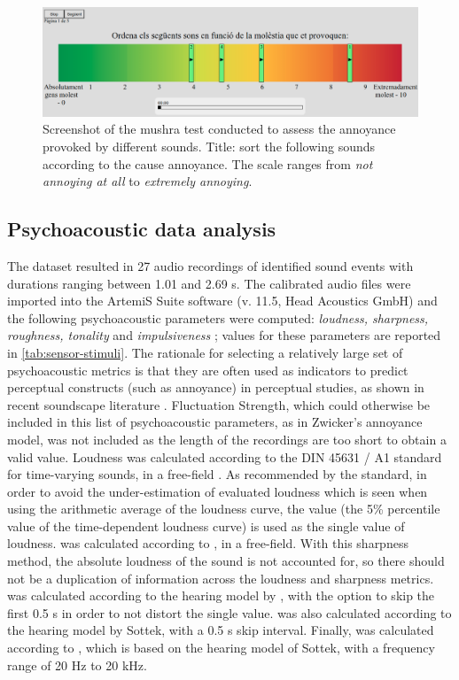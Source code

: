 \begin{figure}
  \centering
  \includegraphics[width=\textwidth]{Figures/mushraScreenShot02.png}
  \caption{Screenshot of the \gls{mushra} test conducted to assess the annoyance provoked by different sounds. Title: sort the following sounds according to the cause annoyance. The scale ranges from \emph{not annoying at all} to \emph{extremely annoying}.  \label{fig:mushra-test}}
\end{figure}

\subsection{Psychoacoustic data analysis}

The dataset resulted in 27 audio recordings of identified sound events with durations ranging between 1.01 and 2.69 s. The calibrated audio files were imported into the ArtemiS Suite software (v. 11.5, Head Acoustics GmbH) and the following psychoacoustic parameters were computed: \emph{loudness, sharpness, roughness, tonality} and \emph{impulsiveness} \citep{PsychoacousticsfactsmodelsZwicker}; values for these parameters are reported in \cref{tab:sensor-stimuli}. The rationale for selecting a relatively large set of psychoacoustic metrics is that they are often used as indicators to predict perceptual constructs (such as annoyance) in perceptual studies, as shown in recent soundscape literature \citep{Aletta2016Soundscape,Aletta2017Dimensions}. Fluctuation Strength, which could otherwise be included in this list of psychoacoustic parameters, as in Zwicker's annoyance model, was not included as the length of the recordings are too short to obtain a valid value. Loudness was calculated according to the DIN 45631 / A1 standard for time-varying sounds, in a free-field \citep{DIN2008Calculation}. As recommended by the standard, in order to avoid the under-estimation of evaluated loudness which is seen when using the arithmetic average of the loudness curve, the  value (the 5\% percentile value of the time-dependent loudness curve) is used as the single value of loudness.  was calculated according to \citet{DIN2009measurement}, in a free-field. With this sharpness method, the absolute loudness of the sound is not accounted for, so there should not be a duplication of information across the loudness and sharpness metrics.  was calculated according to the hearing model by \citet{Sottek2017Sound}, with the option to skip the first 0.5 s in order to not distort the single value.  was also calculated according to the hearing model by Sottek, with a 0.5 s skip interval. Finally,  was calculated according to \citet{ECMA742019Measurement}, which is based on the hearing model of Sottek, with a frequency range of 20 Hz to 20 kHz.


